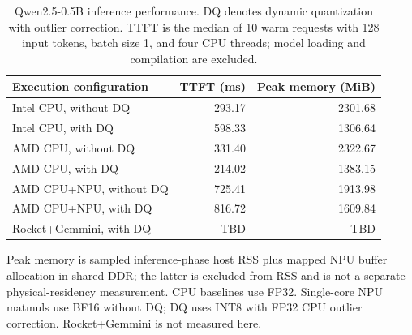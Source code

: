 \begin{table}[t]
    \centering
    \caption{Qwen2.5-0.5B inference performance. DQ denotes dynamic
    quantization with outlier correction. TTFT is the median of 10 warm
    requests with 128 input tokens, batch size 1, and four CPU threads;
    model loading and compilation are excluded.}
    \label{tab:architecture-performance}
    \footnotesize
    \setlength{\tabcolsep}{3pt}
    \begin{tabular}{@{}lrr@{}}
        \hline
        Execution configuration & TTFT (ms) & Peak memory (MiB) \\
        \hline
        Intel CPU, without DQ          & 293.17 & 2301.68 \\
        Intel CPU, with DQ             & 598.33 & 1306.64 \\
        AMD CPU, without DQ            & 331.40 & 2322.67 \\
        AMD CPU, with DQ               & 214.02 & 1383.15 \\
        AMD CPU+NPU, without DQ        & 725.41 & 1913.98 \\
        AMD CPU+NPU, with DQ           & 816.72 & 1609.84 \\
        Rocket+Gemmini, with DQ & TBD & TBD \\
        \hline
    \end{tabular}
    \vspace{2pt}
    \parbox{\columnwidth}{\scriptsize Peak memory is sampled inference-phase
    host RSS plus mapped NPU buffer allocation in shared DDR; the latter is
    excluded from RSS and is not a separate physical-residency measurement.
    CPU baselines use FP32. Single-core NPU matmuls use BF16 without DQ; DQ uses INT8 with
    FP32 CPU outlier correction. Rocket+Gemmini is not measured here.}
\end{table}
